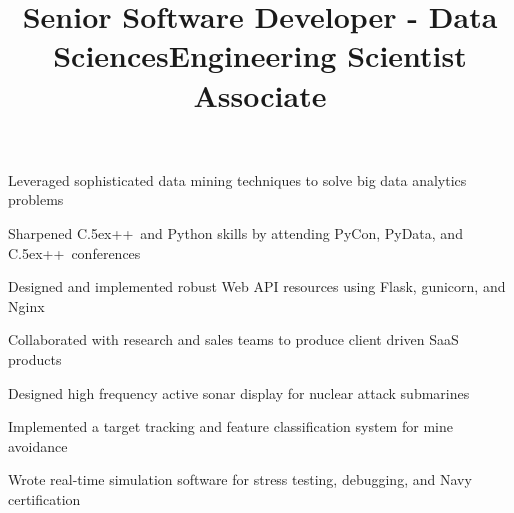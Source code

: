 \documentclass[12pt, tweaklist, line]{res}
\let\tempone\itemize
\let\temptwo\enditemize
\renewenvironment{itemize}{\tempone\vspace{-.15in}\setlength{\topsep}{0pt}\setlength{\itemsep}{3pt}\vspace{-.15in}}{\temptwo}
\def\Cplusplus{{\rm C\raise.5ex\hbox{\small ++}}}
\begin{document}
\begin{resume}
\title{Senior Software Developer - Data Sciences}
\begin{position}
\begin{itemize}
\item Leveraged sophisticated data mining techniques to solve big data analytics problems
\item Sharpened \Cplusplus~and Python skills by attending PyCon, PyData, and \Cplusplus~conferences
\item Designed and implemented robust Web API resources using Flask, gunicorn, and Nginx
\item Collaborated with research and sales teams to produce client driven SaaS products
\end{itemize}
\end{position}

\title{Engineering Scientist Associate} %
\begin{position}
\begin{itemize}
\item Designed high frequency active sonar display for nuclear attack submarines
\item Implemented a target tracking and feature classification system for mine avoidance
\item Wrote real-time simulation software for stress testing, debugging, and Navy certification
\end{itemize}
\end{position}


\end{resume}
\end{document}
